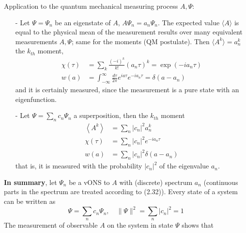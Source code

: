 Application to the quantum mechanical measuring process {$A,\Psi$}:
\begin{enumerate}
    \item[-] Let $\Psi=\Psi_n$ be an eigenstate of $A$, $A\Psi_n=a_n\Psi_n$. The expected value $\langle A\rangle$ is equal to the physical mean of the measurement results over many equivalent measurements {$A,\Psi$}; same for the moments    (QM postulate). Then $\langle A^k\rangle=a_n^k$ the $k_{th}$ moment,%
    \begin{equation}
    \begin{aligned} \chi(\tau) &=\sum_{k} \frac{(-i)^{k}}{k !}\left(a_{n} \tau\right)^{k}=\exp \left(-i a_{n} \tau\right) \\ w(a) &=\int_{-\infty}^{\infty} \frac{d \tau}{2 \pi} e^{i a \tau} e^{-i a_{n} \tau}=\delta\left(a-a_{n}\right) \end{aligned}
    \end{equation}
    and it is certainly measured, since the measurement is a pure state with an eigenfunction.
    \item[-] Let $\Psi=\sum_n c_n\Psi_n$ a superposition, then the $k_{th}$ moment
    \begin{equation}
    \begin{aligned}\left\langle A^{k}\right\rangle &=\sum_{n}\left|c_{n}\right|^{2} a_{n}^{k} \\ \chi(\tau) &=\sum_{n}\left|c_{n}\right|^{2} e^{-i a_{n} \tau} \\ w(a) &=\sum_{n}\left|c_{n}\right|^{2} \delta\left(a-a_{n}\right) \end{aligned}
    \end{equation}
    that is, it is measured with the probability $| c_n|^2$ of the eigenvalue $a_n$.
\end{enumerate}
\textbf{In summary}, let {$\Psi_n$} be a vONS to $A$ with (discrete) spectrum {$a_n$} (continuous parts in the spectrum are treated according to (2.32)). Every state of a system can be written as
\begin{equation}
    \Psi=\sum_{n} c_{n} \Psi_{n}, \quad\|\Psi\|^{2}=\sum_{n}\left|c_{n}\right|^{2}=1
    \end{equation}
The measurement of observable $A$ on the system in state $\Psi$ shows that
